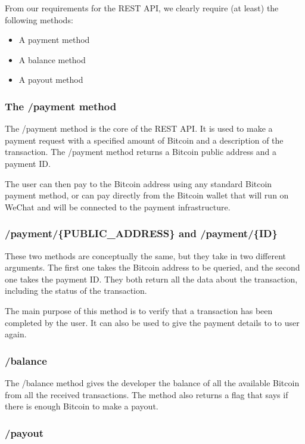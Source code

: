From our requirements for the REST API, we clearly require (at least) the following methods:

\begin{itemize}
	\item A payment method
	\item A balance method
	\item A payout method
\end{itemize}

\subsubsection{The /payment method}
\label{sct:payment}

The /payment method is the core of the REST API. It is used to make a payment request with a specified amount of Bitcoin and a description of the transaction. The /payment method returns a Bitcoin public address and a payment ID. 

The user can then pay to the Bitcoin address using any standard Bitcoin payment method, or can pay directly from the Bitcoin wallet that will run on WeChat and will be connected to the payment infrastructure.

\subsubsection{/payment/\{PUBLIC\_ADDRESS\} and /payment/\{ID\}}

These two methods are conceptually the same, but they take in two different arguments. The first one takes the Bitcoin address to be queried, and the second one takes the payment ID. They both return all the data about the transaction, including the status of the transaction. 

The main purpose of this method is to verify that a transaction has been completed by the user. It can also be used to give the payment details to to user again.

\subsubsection{/balance}

The /balance method gives the developer the balance of all the available Bitcoin from all the received transactions. The method also returns a flag that says if there is enough Bitcoin to make a payout.

\subsubsection{/payout}

